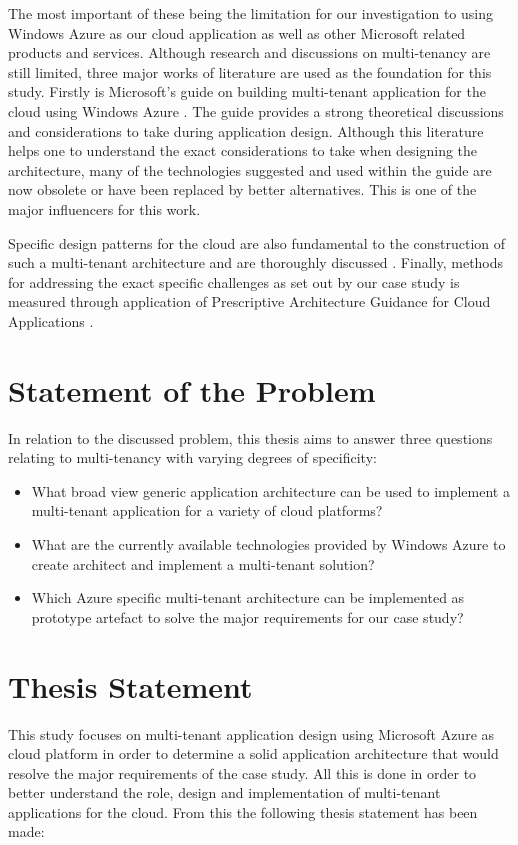 The most important of these being the limitation for our investigation to using Windows Azure as our cloud application as well as other Microsoft related products and services. Although research and discussions on multi-tenancy are still limited, three major works of literature are used as the foundation for this study. Firstly is Microsoft's guide on building multi-tenant application for the cloud using Windows Azure \cite{Betts2012-ad}. The guide provides a strong theoretical discussions and considerations to take during application design. Although this literature helps one to understand the exact considerations to take when designing the architecture, many of the technologies suggested and used within the guide are now obsolete or have been replaced by better alternatives. This is one of the major influencers for this work.

Specific design patterns for the cloud are also fundamental to the construction of such a multi-tenant architecture and are thoroughly discussed \cite{Wilder2012-so}. Finally, methods for addressing the exact specific challenges as set out by our case study is measured through application of Prescriptive Architecture Guidance for Cloud Applications \cite{Homer2014}. 

\section{Statement of the Problem}
In relation to the discussed problem, this thesis aims to answer three questions relating to multi-tenancy with varying degrees of specificity:
\begin{itemize}
\item What broad view generic application architecture can be used to implement a multi-tenant application for a variety of cloud platforms?
\item What are the currently available technologies provided by Windows Azure to create architect and implement a multi-tenant solution?
\item Which Azure specific multi-tenant architecture can be implemented as prototype artefact to solve the major requirements for our case study?
\end{itemize}

\section{Thesis Statement}
This study focuses on multi-tenant application design using Microsoft Azure as cloud platform in order to determine a solid application architecture that would resolve the major requirements of the case study. All this is done in order to better understand the role, design and implementation of multi-tenant applications for the cloud. From this the following thesis statement has been made:
 
